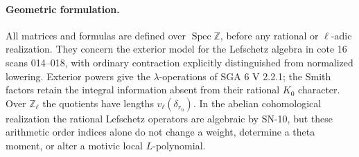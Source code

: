 \paragraph{Geometric formulation.}
All matrices and formulas are defined over
$\operatorname{Spec}\mathbb Z$, before any rational or
$\ell$-adic realization. They concern the exterior model for
the Lefschetz algebra in cote 16 scans 014--018, with ordinary
contraction explicitly distinguished from normalized lowering.
Exterior powers give the $\lambda$-operations of SGA 6 V 2.2.1;
the Smith factors retain the integral information absent from
their rational $K_0$ character. Over $\mathbb Z_\ell$ the
quotients have lengths $v_\ell(\delta_{r_n})$. In the abelian
cohomological realization the rational Lefschetz operators are
algebraic by SN-10, but these arithmetic order indices alone
do not change a weight, determine a theta moment, or alter a
motivic local $L$-polynomial.
